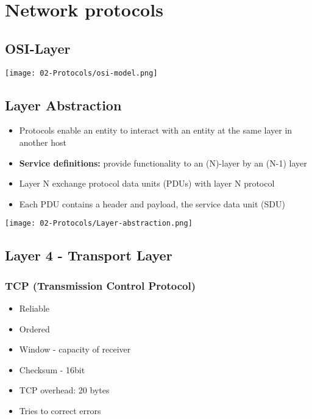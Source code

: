 


\section{Network protocols}

\subsection{OSI-Layer}

\begin{center}
    \texttt{[image: 02-Protocols/osi-model.png]}
    \vspace{-8pt}
\end{center}

\subsection{Layer Abstraction}
\begin{itemize}
    \item Protocols enable an entity to interact with an entity at the same layer in another host
    \item \textbf{Service definitions:} provide functionality to an (N)-layer by an (N-1) layer
    \item Layer N exchange protocol data units (PDUs) with layer N protocol
    \item Each PDU contains a header and payload, the service data unit (SDU)
\end{itemize}
\vspace{-8pt}
\begin{center}
    \texttt{[image: 02-Protocols/Layer-abstraction.png]}
\end{center}
\vspace{-8pt}

\subsection{Layer 4 - Transport Layer}

\subsubsection{TCP (Transmission Control Protocol)}
\begin{itemize}
    \item Reliable
    \item Ordered
    \item Window - capacity of receiver
    \item Checksum - 16bit
    \item TCP overhead: 20 bytes
    \item Tries to correct errors
\end{itemize}

